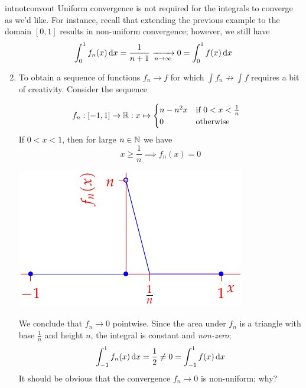 \begin{examples}{}{intnotconvout}
	\exstart Uniform convergence is not required for the integrals to converge as we'd like. For instance, recall that extending the previous example to the domain $[0,1]$ results in non-uniform convergence; however, we still have
	\[
		\int_0^1f_n(x)\,{\mathrm{d} x}=\frac 1{n+1}\xrightarrow[n\to\infty]{} 0 =\int_0^1f(x)\,{\mathrm{d} x}
	\]
  
	\begin{enumerate}\setcounter{enumi}{1}
	  \item\label{ex:intnotconv} To obtain a sequence of functions $f_n\to f$ for which $\int f_n\nrightarrow\int f$ requires a bit of creativity. Consider the sequence\smallbreak
	  \begin{minipage}[t]{0.6\linewidth}\vspace{-15pt}
		  \begin{align*}
			  f_n&:[-1,1]\to\mathbb{R} :x\mapsto 
			  \begin{cases}
			  	n-n^2x&\text{if }0<x<\frac 1n\\
			  	0&\text{otherwise}
			  \end{cases}
		  \end{align*}
		  If $0<x<1$, then for large $n\in\mathbb{N}$ we have
		  \[
		  	x\ge\frac 1n\implies f_n(x)=0
		  \]
	  \end{minipage}
	  \hfill
	  \begin{minipage}[t]{0.39\linewidth}\vspace{-10pt}
	  \flushright\includegraphics[scale=0.95]{seqex10}
	  \end{minipage}\par
	  We conclude that $f_n\to 0$ pointwise. Since the area under $f_n$ is a triangle with base $\frac 1n$ and height $n$, the integral is constant and \emph{non-zero};
	  \[
	  	\int_{-1}^1 f_n(x)\,{\mathrm{d} x}=\frac 12\neq 0=\int_{-1}^1f(x)\,{\mathrm{d} x}
	  \]
	  It should be obvious that the convergence $f_n\to 0$ is non-uniform; why?
	\end{enumerate}
\end{examples}


